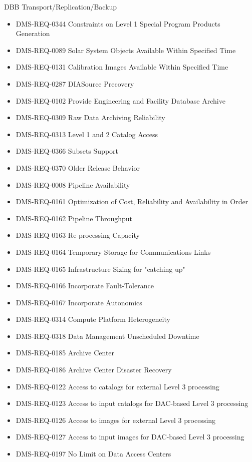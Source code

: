 DBB Transport/Replication/Backup \begin{itemize}
\item DMS-REQ-0344 Constraints on Level 1 Special Program Products Generation
\item DMS-REQ-0089 Solar System Objects Available Within Specified Time
\item DMS-REQ-0131 Calibration Images Available Within Specified Time
\item DMS-REQ-0287 DIASource Precovery
\item DMS-REQ-0102 Provide Engineering and Facility Database Archive
\item DMS-REQ-0309 Raw Data Archiving Reliability
\item DMS-REQ-0313 Level 1 and 2 Catalog Access
\item DMS-REQ-0366 Subsets Support
\item DMS-REQ-0370 Older Release Behavior
\item DMS-REQ-0008 Pipeline Availability
\item DMS-REQ-0161 Optimization of Cost, Reliability and Availability in Order
\item DMS-REQ-0162 Pipeline Throughput
\item DMS-REQ-0163 Re-processing Capacity
\item DMS-REQ-0164 Temporary Storage for Communications Links
\item DMS-REQ-0165 Infrastructure Sizing for "catching up"
\item DMS-REQ-0166 Incorporate Fault-Tolerance
\item DMS-REQ-0167 Incorporate Autonomics
\item DMS-REQ-0314 Compute Platform Heterogeneity
\item DMS-REQ-0318 Data Management Unscheduled Downtime
\item DMS-REQ-0185 Archive Center
\item DMS-REQ-0186 Archive Center Disaster Recovery
\item DMS-REQ-0122 Access to catalogs for external Level 3 processing
\item DMS-REQ-0123 Access to input catalogs for DAC-based Level 3 processing
\item DMS-REQ-0126 Access to images for external Level 3 processing
\item DMS-REQ-0127 Access to input images for DAC-based Level 3 processing
\item DMS-REQ-0197 No Limit on Data Access Centers
\end{itemize}
